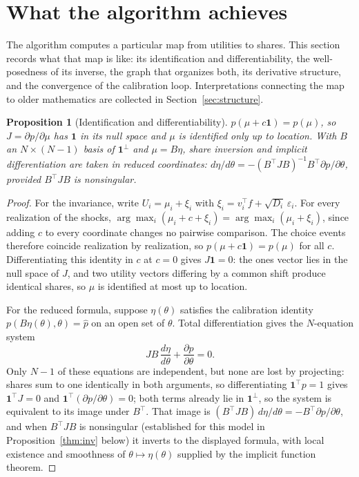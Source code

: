 \documentclass[12pt]{article}
\newtheorem{proposition}{Proposition}
\theoremstyle{remark}
\begin{document}
\section{What the algorithm achieves}\label{sec:theory}

The algorithm computes a particular map from utilities to shares. This
section records what that map is like: its identification and
differentiability, the well-posedness of its inverse, the graph that
organizes both, its derivative structure, and the convergence of the
calibration loop. Interpretations connecting the map to older
mathematics are collected in Section~\ref{sec:structure}.

\begin{proposition}[Identification and differentiability]\label{prop:ident}
$p(\mu + c\mathbf{1}) = p(\mu)$, so $J = \partial p/\partial \mu$ has
$\mathbf{1}$ in its null space and $\mu$ is identified only up to location.
With $B$ an $N \times (N-1)$ basis of $\mathbf{1}^\perp$ and $\mu = B\eta$,
share inversion and implicit differentiation are taken in reduced coordinates:
$d\eta/d\theta = -(B^\top J B)^{-1} B^\top \partial p/\partial\theta$,
provided $B^\top J B$ is nonsingular.
\end{proposition}
\begin{proof}
For the invariance, write $U_i = \mu_i + \xi_i$ with $\xi_i = v_i^\top f
+ \sqrt{D_i}\,\varepsilon_i$. For every realization of the shocks,
$\arg\max_i (\mu_i + c + \xi_i) = \arg\max_i (\mu_i + \xi_i)$, since
adding $c$ to every coordinate changes no pairwise comparison. The choice
events therefore coincide realization by realization, so $p(\mu +
c\mathbf{1}) = p(\mu)$ for all $c$. Differentiating this identity in $c$
at $c = 0$ gives $J\mathbf{1} = 0$: the ones vector lies in the null space
of $J$, and two utility vectors differing by a common shift produce
identical shares, so $\mu$ is identified at most up to location.

For the reduced formula, suppose $\eta(\theta)$ satisfies the calibration
identity $p(B\eta(\theta), \theta) = \hat p$ on an open set of
$\theta$. Total differentiation gives the $N$-equation system
\[
J B \,\frac{d\eta}{d\theta} + \frac{\partial p}{\partial \theta}
= 0 .
\]
Only $N - 1$ of these equations are independent, but none are lost by
projecting: shares sum to one identically in both arguments, so
differentiating $\mathbf{1}^\top p = 1$ gives $\mathbf{1}^\top J = 0$
and $\mathbf{1}^\top (\partial p / \partial \theta) = 0$; both terms
already lie in $\mathbf{1}^\perp$, so the system is equivalent to its
image under $B^\top$. That image is $(B^\top J B)\, d\eta/d\theta =
-B^\top \partial p/\partial\theta$, and when $B^\top J B$ is
nonsingular (established for this model in Proposition~\ref{thm:inv} below) it
inverts to the displayed formula, with local existence and smoothness of
$\theta \mapsto \eta(\theta)$ supplied by the implicit function theorem.
\end{proof}
\end{document}
